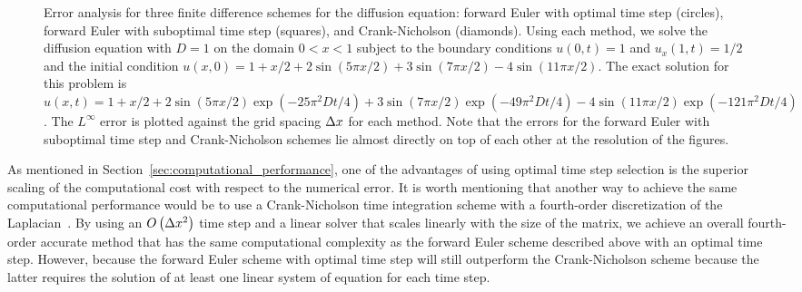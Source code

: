 \documentclass[oneeqnum,onefignum,onetabnum,onethmnum]{siamltex}
\begin{document}
\begin{figure}[htb]
\begin{center}
\caption{Error analysis for three finite difference schemes for the 
diffusion equation: forward Euler with optimal time step (circles), forward 
Euler with suboptimal time step (squares), and Crank-Nicholson (diamonds).  
Using each method, we solve the diffusion equation with $D = 1$ on the 
domain $0 < x < 1$ subject to the boundary conditions 
$u(0,t) = 1$ and $u_x(1,t) = 1/2$ 
and the initial condition
$u(x,0) = 1 + x/2 + 2 \sin(5 \pi x/2) + 3 \sin(7 \pi x/2) 
- 4 \sin(11 \pi x/2)$.  
The exact solution for this problem is
$u(x,t) = 1 + x/2 
        + 2 \sin(5 \pi x/2)  \exp(-25 \pi^2 Dt/4) 
        + 3 \sin(7 \pi x/2)  \exp(-49 \pi^2 Dt/4)
        - 4 \sin(11 \pi x/2) \exp(-121 \pi^2 Dt/4)$.
The $L^\infty$ error is plotted against the grid spacing $\Delta x$ for each 
method.  Note that the errors for the forward Euler with suboptimal time 
step and Crank-Nicholson schemes lie almost directly on top of each other
at the resolution of the figures.
}
\label{fig:diffusion_eqn_1d_no_src_error}
\end{center}
\end{figure}

As mentioned in Section~\ref{sec:computational_performance}, one of the 
advantages of using optimal time step selection is the superior scaling of 
the computational cost with respect to the numerical error.  It is worth 
mentioning that another way to achieve the same computational performance
would be to use a Crank-Nicholson time integration scheme with a fourth-order 
discretization of the Laplacian~\cite{gibou_2005}.  By using an 
$O\left(\Delta x^2 \right)$ time step and a linear solver that scales linearly 
with the size of the matrix, we achieve an overall fourth-order accurate 
method that has the same computational complexity as the forward Euler scheme
described above with an optimal time step.  However, because the forward Euler 
scheme with optimal time step will still outperform the Crank-Nicholson scheme 
because the latter requires the solution of at least one linear system of
equation for each time step. 
\end{document}
